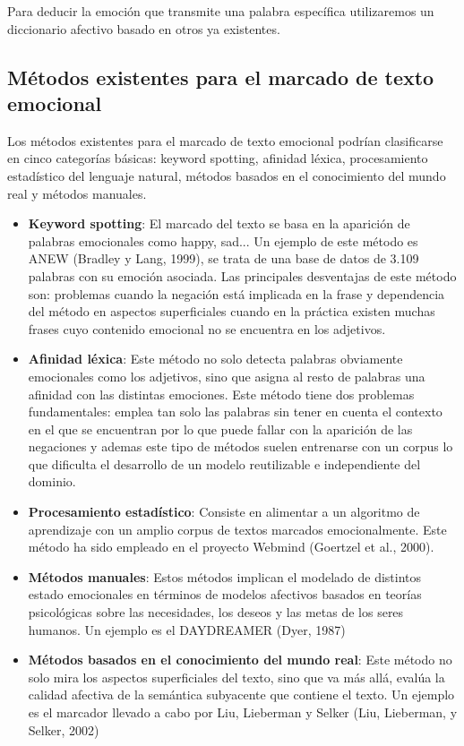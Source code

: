 Para deducir la emoción que transmite una palabra específica utilizaremos un diccionario afectivo basado en otros ya existentes.

\subsection{Métodos existentes para el marcado de texto emocional}

Los métodos existentes para el marcado de texto emocional podrían clasificarse en cinco categorías básicas: keyword spotting, afinidad léxica, procesamiento estadístico del lenguaje natural, métodos basados en el conocimiento del mundo real y métodos manuales.


\begin{itemize}
	\item \textbf{Keyword spotting}: El marcado del texto se basa en la aparición de palabras emocionales como happy, sad... Un
ejemplo de este método es ANEW (Bradley y Lang, 1999), se trata de una base de datos de 3.109 palabras con su emoción asociada. Las principales desventajas de este método son: problemas cuando la negación está implicada en la frase y dependencia del método en aspectos superficiales cuando en la práctica existen muchas frases cuyo contenido emocional no se encuentra en los adjetivos.
	\item \textbf{Afinidad léxica}: Este método no solo detecta palabras obviamente emocionales como los adjetivos, sino que asigna al resto de palabras una afinidad con las distintas emociones. Este método tiene dos problemas fundamentales: emplea tan solo las palabras sin tener en cuenta el contexto en el que se encuentran por lo que puede fallar con la aparición de las negaciones y ademas este tipo de métodos suelen entrenarse con un corpus lo que dificulta el desarrollo de un modelo reutilizable e independiente del dominio.
	\item \textbf{Procesamiento estadístico}: Consiste en alimentar a un algoritmo de aprendizaje con un amplio corpus de textos marcados emocionalmente. Este método ha sido empleado en el proyecto Webmind (Goertzel et al., 2000).
	\item \textbf{Métodos manuales}: Estos métodos implican el modelado de distintos estado emocionales en términos de modelos afectivos basados en teorías psicológicas sobre las necesidades, los deseos y las metas de los seres humanos. Un ejemplo es el DAYDREAMER (Dyer, 1987)
	\item \textbf{Métodos basados en el conocimiento del mundo real}: Este método no solo mira los aspectos superficiales del texto, sino que va más allá, evalúa la calidad afectiva de la semántica subyacente que contiene el texto. Un ejemplo es el marcador llevado a cabo por Liu, Lieberman y Selker (Liu, Lieberman, y Selker, 2002)

\end{itemize}

